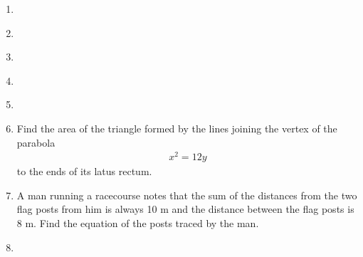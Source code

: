 \begin{enumerate}[label=\thesection.\arabic*,ref=\thesection.\theenumi]

\item 
\item 
\label{chapters/11/11/5/2}

\item 
\item 
\label{chapters/11/11/5/4}

\item 
    \item Find the area of the triangle formed by the lines joining the vertex 
    of the parabola 
    \begin{align}
        x^2 = 12y
        \label{eq:chapters/11/11/5/6/parabola}
    \end{align}
    to the ends of its latus rectum.
\label{chapters/11/11/5/6}

\item A man running a racecourse notes that the sum of the distances from the two flag posts from him is always 10 m and the distance between the flag posts is 8 m. Find the equation of the posts traced by the man. 
\label{chapters/11/11/5/7}

\item 
\label{chapters/11/11/5/8}


\end{enumerate}
